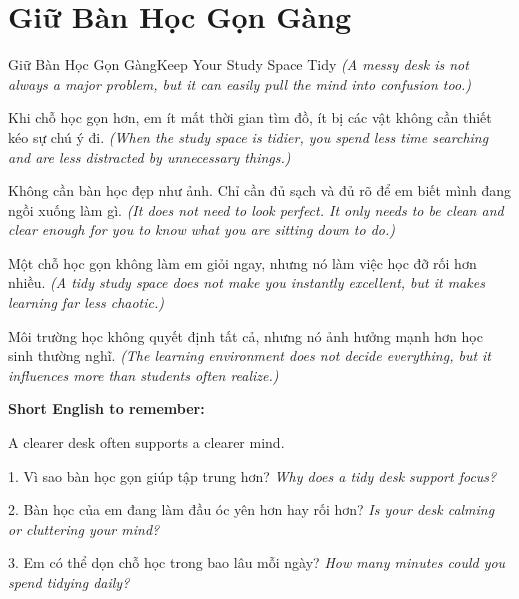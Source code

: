 \section{Giữ Bàn Học Gọn Gàng}
\begin{truyen}{Giữ Bàn Học Gọn Gàng}{Keep Your Study Space Tidy}
\textit{(A messy desk is not always a major problem, but it can easily pull the mind into confusion too.)}

Khi chỗ học gọn hơn, em ít mất thời gian tìm đồ, ít bị các vật không cần thiết kéo sự chú ý đi.
\textit{(When the study space is tidier, you spend less time searching and are less distracted by unnecessary things.)}

Không cần bàn học đẹp như ảnh. Chỉ cần đủ sạch và đủ rõ để em biết mình đang ngồi xuống làm gì.
\textit{(It does not need to look perfect. It only needs to be clean and clear enough for you to know what you are sitting down to do.)}

Một chỗ học gọn không làm em giỏi ngay, nhưng nó làm việc học đỡ rối hơn nhiều.
\textit{(A tidy study space does not make you instantly excellent, but it makes learning far less chaotic.)}
\end{truyen}

\begin{baihoc}
Môi trường học không quyết định tất cả, nhưng nó ảnh hưởng mạnh hơn học sinh thường nghĩ.
\textit{(The learning environment does not decide everything, but it influences more than students often realize.)}
\end{baihoc}

\begin{ghinhoanh}
\textbf{Short English to remember:}

A clearer desk often supports a clearer mind.

\end{ghinhoanh}

\begin{tuhocnhanh}
1. Vì sao bàn học gọn giúp tập trung hơn? \textit{Why does a tidy desk support focus?}

2. Bàn học của em đang làm đầu óc yên hơn hay rối hơn? \textit{Is your desk calming or cluttering your mind?}

3. Em có thể dọn chỗ học trong bao lâu mỗi ngày? \textit{How many minutes could you spend tidying daily?}
\end{tuhocnhanh}
\ngancach

